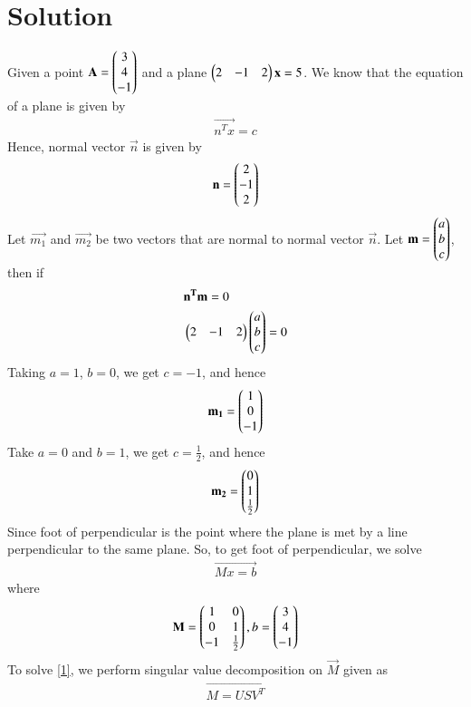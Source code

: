 \documentclass[journal,12pt,twocolumn]{IEEEtran}
\begin{document}
\section{Solution}
Given a point $\mathbf{A} = \begin{pmatrix}3 \\4\\-1\end{pmatrix}$  and a plane $\begin{pmatrix}2 & -1 & 2\end{pmatrix}\mathbf{x}=5$. We know that the equation of a plane is given by
\begin{align}
	\vec{n^Tx}= c
\end{align}
Hence, normal vector $\vec{n}$ is given by
\begin{align}
	\mathbf{n} = \begin{pmatrix}2 \\ -1\\ 2 \end{pmatrix}
\end{align}
Let $\vec{m_1}$ and $\vec{m_2}$ be two vectors that are normal to normal vector $\vec{n}$.
Let $\mathbf{m}= \begin{pmatrix}a\\b\\c\end{pmatrix}$, then if
\begin{align}
& \mathbf{n^Tm}= 0 \\
& \begin{pmatrix}2 & -1 &2\end{pmatrix}\begin{pmatrix}a\\b\\c\end{pmatrix} = 0
\end{align}
Taking $a =1$, $b=0$, we get $c=-1$, and hence
\begin{align}
	\mathbf{m_1}= \begin{pmatrix}1\\0\\-1\end{pmatrix}
\end{align}
Take $a=0$ and $b=1$, we get $c=\frac{1}{2}$, and hence
\begin{align}
	\mathbf{m_2}= \begin{pmatrix}0\\1\\\frac{1}{2}\end{pmatrix}
\end{align}
Since  foot of perpendicular is the point where the plane is met by a line perpendicular to the same plane. So, to get foot of perpendicular, we solve
\begin{align}
\vec{Mx=b} \label{1}
\end{align}
where
\begin{align}
\mathbf{M} = \begin{pmatrix}1 & 0 \\ 0 & 1 \\ -1 & \frac{1}{2}\end{pmatrix},b = \begin{pmatrix}3 \\4\\-1\end{pmatrix}\label{2}	
\end{align}
To solve \eqref{1}, we perform singular value decomposition on $\vec{M}$ given as 
\begin{align}
	\vec{M = USV^T }\label{3}
\end{align}
\end{document}
